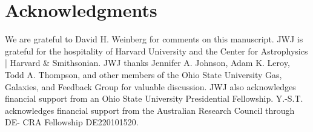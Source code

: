 \documentclass[ms.tex]{subfiles}
\begin{document}
\section{Acknowledgments}
\label{sec:acknowledgments}

We are grateful to David H. Weinberg for comments on this manuscript.
JWJ is grateful for the hospitality of Harvard University and the 
Center for Astrophysics | Harvard \& Smithsonian.
JWJ thanks Jennifer A. Johnson, Adam K. Leroy, Todd A. Thompson, and other
members of the Ohio State University Gas, Galaxies, and Feedback Group for
valuable discussion.
JWJ also acknowledges financial support from an Ohio State University
Presidential Fellowship.
Y.-S.T. acknowledges financial support from the Australian Research Council
through DE- CRA Fellowship DE220101520.
\end{document}
